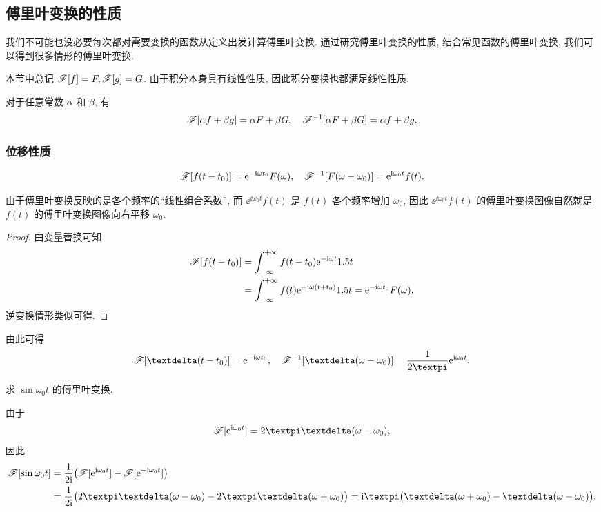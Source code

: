\subsection{傅里叶变换的性质}

我们不可能也没必要每次都对需要变换的函数从定义出发计算傅里叶变换. 
通过研究傅里叶变换的性质, 结合常见函数的傅里叶变换, 我们可以得到很多情形的傅里叶变换.

本节中总记 $\mathscr{F}[f]=F,\mathscr{F}[g]=G$.
由于积分本身具有线性性质, 因此积分变换也都满足线性性质.

\begin{theorem}[线性性质]
  对于任意常数 $\alpha$ 和 $\beta$, 有
  \[
    \mathscr{F}[\alpha f+\beta g]=\alpha F+\beta G,\quad
    \mathscr{F}^{-1}[\alpha F+\beta G]=\alpha f+\beta g.
  \]
\end{theorem}


\subsubsection{位移性质}

\begin{theorem}[位移性质]
  \[\mathscr{F}[f(t-t_0)]=\mathrm{e}^{-\mathrm{i} \omega t_0}F(\omega),\quad
  \mathscr{F}^{-1}[F(\omega-\omega_0)]=\mathrm{e}^{\mathrm{i} \omega_0 t}f(t).\]
\end{theorem}

由于傅里叶变换反映的是各个频率的``线性组合系数'', 而 $\ee^{\ii \omega_0 t}f(t)$ 是 $f(t)$ 各个频率增加 $\omega_0$, 因此 $\ee^{\ii \omega_0 t}f(t)$ 的傅里叶变换图像自然就是 $f(t)$ 的傅里叶变换图像向右平移 $\omega_0$.

\begin{proof}
  由变量替换可知
  \begin{align*}
    \mathscr{F}[f(t-t_0)]&=\displaystyle\int_{-\infty}^{+\infty} f(t-t_0)\mathrm{e}^{-\mathrm{i} \omega t}1.5 t\\
    &=\displaystyle\int_{-\infty}^{+\infty} f(t)\mathrm{e}^{-\mathrm{i} \omega (t+t_0)}1.5 t=\mathrm{e}^{-\mathrm{i} \omega t_0}F(\omega).
  \end{align*}
  逆变换情形类似可得.
\end{proof}

由此可得
\[
  \msf[\dirac(t-t_0)]=\ee^{-\ii \omega t_0},\quad
  \msf^{-1}[\dirac(\omega-\omega_0)]=\dfrac1{2\cpi}\ee^{\ii \omega_0 t}.
\]

\begin{example}
  求 $\sin{\omega_0 t}$ 的傅里叶变换.
\end{example}

\begin{solution}
  由于
  \[
    \msf[\ee^{\ii \omega_0t}]=2\cpi\dirac(\omega-\omega_0),
  \]
  因此
  \begin{align*}
    \msf[\sin{\omega_0 t}]&=\frac1{2\ii }\bigl(\msf[\ee^{\ii \omega_0t}]-\msf[\ee^{-\ii \omega_0t}]\bigr)\\
    &=\frac1{2\ii }\bigl(2\cpi\dirac(\omega-\omega_0)-2\cpi\dirac(\omega+\omega_0)\bigr)
    =\ii \cpi\bigl(\dirac(\omega+\omega_0)-\dirac(\omega-\omega_0)\bigr).
  \end{align*}
\end{solution}

